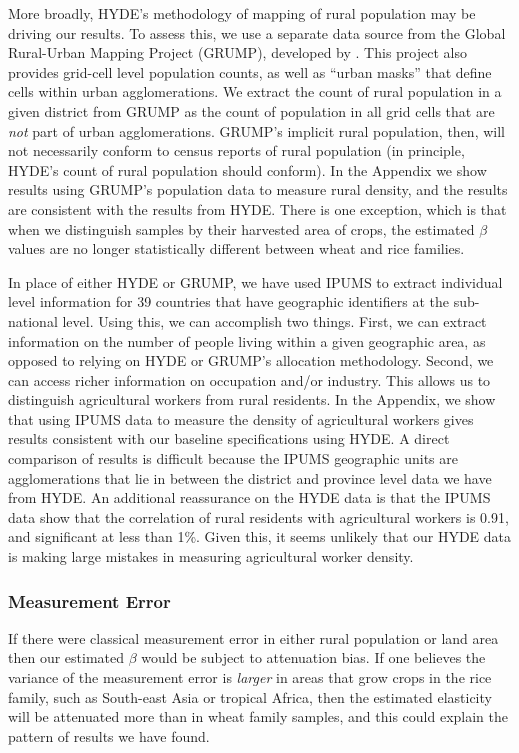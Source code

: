 \documentclass[11pt]{article}
\begin{document}
More broadly, HYDE's methodology of mapping of rural population may be driving our results. To assess this, we use a separate data source from the Global Rural-Urban Mapping Project (GRUMP), developed by \cite{Balketal2006}. This project also provides grid-cell level population counts, as well as ``urban masks'' that define cells within urban agglomerations. We extract the count of rural population in a given district from GRUMP as the count of population in all grid cells that are \textit{not} part of urban agglomerations. GRUMP's implicit rural population, then, will not necessarily conform to census reports of rural population (in principle, HYDE's count of rural population should conform). In the Appendix we show results using GRUMP's population data to measure rural density, and the results are consistent with the results from HYDE. There is one exception, which is that when we distinguish samples by their harvested area of crops, the estimated $\beta$ values are no longer statistically different between wheat and rice families. 

In place of either HYDE or GRUMP, we have used IPUMS \nocite{ipums} to extract individual level information for 39 countries that have geographic identifiers at the sub-national level. Using this, we can accomplish two things. First, we can extract information on the number of people living within a given geographic area, as opposed to relying on HYDE or GRUMP's allocation methodology. Second, we can access richer information on occupation and/or industry. This allows us to distinguish agricultural workers from rural residents. In the Appendix, we show that using IPUMS data to measure the density of agricultural workers gives results consistent with our baseline specifications using HYDE. A direct comparison of results is difficult because the IPUMS geographic units are agglomerations that lie in between the district and province level data we have from HYDE. An additional reassurance on the HYDE data is that the IPUMS data show that the correlation of rural residents with agricultural workers is 0.91, and significant at less than 1\%. Given this, it seems unlikely that our HYDE data is making large mistakes in measuring agricultural worker density.

\subsubsection{Measurement Error} 
If there were classical measurement error in either rural population or land area then our estimated $\beta$ would be subject to attenuation bias. If one believes the variance of the measurement error is \textit{larger} in areas that grow crops in the rice family, such as South-east Asia or tropical Africa, then the estimated elasticity will be attenuated more than in wheat family samples, and this could explain the pattern of results we have found. 
\end{document}
